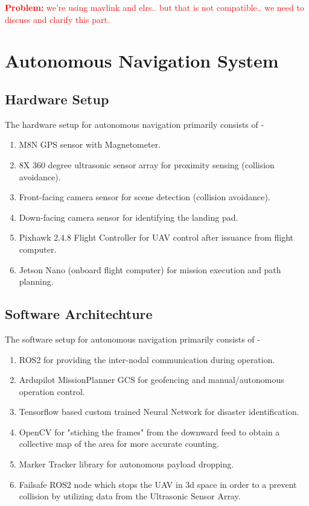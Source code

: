 \documentclass[12pt]{report}
\begin{document}
        \textcolor{red}{\textbf{Problem:} we're using mavlink and elrs.. but that is not compatible.. we need to discuss and clarify this part.}

    \section{Autonomous Navigation System}
      \subsection{Hardware Setup}
      The hardware setup for autonomous navigation primarily consists of -
      \begin{enumerate}
        \item M8N GPS sensor with Magnetometer.
        \item 8X 360 degree ultrasonic sensor array for proximity sensing (collision avoidance).
        \item Front-facing camera sensor for scene detection (collision avoidance).
        \item Down-facing camera sensor for identifying the landing pad.
        \item Pixhawk 2.4.8 Flight Controller for UAV control after issuance from flight computer.
        \item Jetson Nano (onboard flight computer) for mission execution and path planning.
      \end{enumerate}
      \subsection{Software Architechture}
      The software setup for autonomous navigation primarily consists of - 
      \begin{enumerate}
        \item ROS2 for providing the inter-nodal communication during operation.
        \item Ardupilot MissionPlanner GCS for geofencing and manual/autonomous operation control.
        \item Tensorflow based custom trained Neural Network for disaster identification.
        \item OpenCV for "stiching the frames" from the downward feed to obtain a collective map of the area for more accurate counting.
        \item Marker Tracker library for autonomous payload dropping.
        \item Failsafe ROS2 node which stops the UAV in 3d space in order to a prevent collision by utilizing data from the Ultrasonic Sensor Array.
      \end{enumerate}
\end{document}

